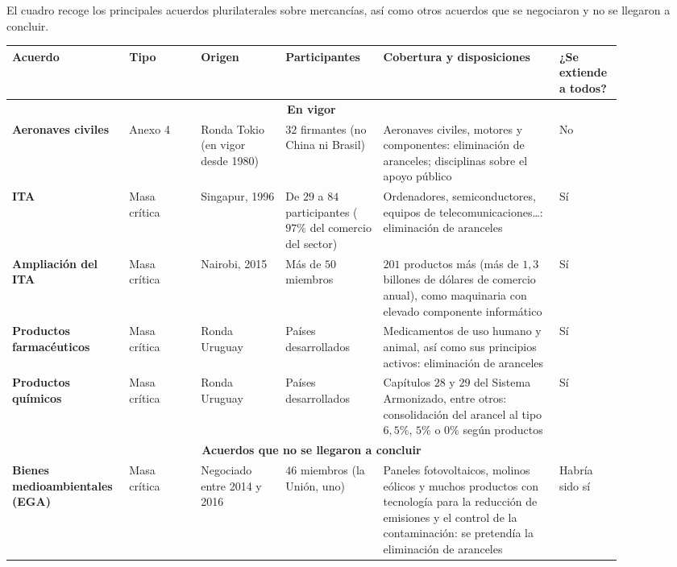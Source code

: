 \documentclass[10pt,a4paper]{article}
\begin{document}
El cuadro recoge los principales acuerdos plurilaterales sobre mercancías, así como otros acuerdos que se negociaron y no se llegaron a concluir.

\begin{center}
\scriptsize
\begin{tabular}{|p{0.13\linewidth}|p{0.11\linewidth}|p{0.13\linewidth}|p{0.15\linewidth}|p{0.27\linewidth}|p{0.09\linewidth}|}
\hline
\textbf{Acuerdo} & \textbf{Tipo} & \textbf{Origen} & \textbf{Participantes} & \textbf{Cobertura y disposiciones} & \textbf{¿Se extiende a todos?} \\
\hline
\multicolumn{6}{|c|}{\textbf{En vigor}} \\
\hline
\textbf{Aeronaves civiles} & Anexo 4 & Ronda Tokio (en vigor desde 1980) & $32$ firmantes (no China ni Brasil) & Aeronaves civiles, motores y componentes: eliminación de aranceles; disciplinas sobre el apoyo público & No \\
\hline
\textbf{ITA} & Masa crítica & Singapur, 1996 & De $29$ a $84$ participantes ($97\%$ del comercio del sector) & Ordenadores, semiconductores, equipos de telecomunicaciones\ldots: eliminación de aranceles & Sí \\
\hline
\textbf{Ampliación del ITA} & Masa crítica & Nairobi, 2015 & Más de $50$ miembros & $201$ productos más (más de $1,3$ billones de dólares de comercio anual), como maquinaria con elevado componente informático & Sí \\
\hline
\textbf{Productos farmacéuticos} & Masa crítica & Ronda Uruguay & Países desarrollados & Medicamentos de uso humano y animal, así como sus principios activos: eliminación de aranceles & Sí \\
\hline
\textbf{Productos químicos} & Masa crítica & Ronda Uruguay & Países desarrollados & Capítulos $28$ y $29$ del Sistema Armonizado, entre otros: consolidación del arancel al tipo $6,5\%$, $5\%$ o $0\%$ según productos & Sí \\
\hline
\multicolumn{6}{|c|}{\textbf{Acuerdos que no se llegaron a concluir}} \\
\hline
\textbf{Bienes medioambientales (EGA)} & Masa crítica & Negociado entre 2014 y 2016 & $46$ miembros (la Unión, uno) & Paneles fotovoltaicos, molinos eólicos y muchos productos con tecnología para la reducción de emisiones y el control de la contaminación: se pretendía la eliminación de aranceles & Habría sido sí \\
\hline
\end{tabular}
\end{center}
\end{document}
